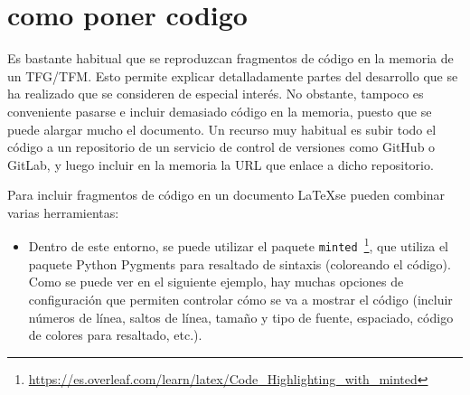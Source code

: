 \documentclass[a4paper, 12pt]{book}
\begin{document}
\section{como poner codigo}


Es bastante habitual que se reproduzcan fragmentos de código en la memoria de un TFG/TFM.
Esto permite explicar detalladamente partes del desarrollo que se ha realizado que se consideren
de especial interés. No obstante, tampoco es conveniente pasarse e incluir demasiado código en
la memoria, puesto que se puede alargar mucho el documento. Un recurso muy habitual es subir
todo el código a un repositorio de un servicio de control de versiones como GitHub o GitLab,
y luego incluir en la memoria la URL que enlace a dicho repositorio.





Para incluir fragmentos de código en un documento \LaTeX se pueden combinar varias
herramientas:

\begin{itemize}
    
    \item Dentro de este entorno, se puede utilizar el paquete 
    \texttt{minted}~\footnote{\url{https://es.overleaf.com/learn/latex/Code_Highlighting_with_minted}},
    que utiliza el paquete Python Pygments para resaltado de sintaxis (coloreando el
    código). Como se puede ver en el siguiente ejemplo, hay muchas opciones de configuración
    que permiten controlar cómo se va a mostrar el código (incluir números de línea, saltos
    de línea, tamaño y tipo de fuente, espaciado, código de colores para resaltado, etc.).
\end{itemize}
\end{document}
